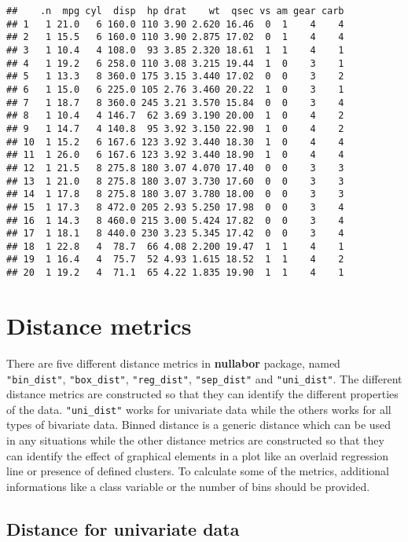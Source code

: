 \begin{verbatim}
##    .n  mpg cyl  disp  hp drat    wt  qsec vs am gear carb
## 1   1 21.0   6 160.0 110 3.90 2.620 16.46  0  1    4    4
## 2   1 15.5   6 160.0 110 3.90 2.875 17.02  0  1    4    4
## 3   1 10.4   4 108.0  93 3.85 2.320 18.61  1  1    4    1
## 4   1 19.2   6 258.0 110 3.08 3.215 19.44  1  0    3    1
## 5   1 13.3   8 360.0 175 3.15 3.440 17.02  0  0    3    2
## 6   1 15.0   6 225.0 105 2.76 3.460 20.22  1  0    3    1
## 7   1 18.7   8 360.0 245 3.21 3.570 15.84  0  0    3    4
## 8   1 10.4   4 146.7  62 3.69 3.190 20.00  1  0    4    2
## 9   1 14.7   4 140.8  95 3.92 3.150 22.90  1  0    4    2
## 10  1 15.2   6 167.6 123 3.92 3.440 18.30  1  0    4    4
## 11  1 26.0   6 167.6 123 3.92 3.440 18.90  1  0    4    4
## 12  1 21.5   8 275.8 180 3.07 4.070 17.40  0  0    3    3
## 13  1 21.0   8 275.8 180 3.07 3.730 17.60  0  0    3    3
## 14  1 17.8   8 275.8 180 3.07 3.780 18.00  0  0    3    3
## 15  1 17.3   8 472.0 205 2.93 5.250 17.98  0  0    3    4
## 16  1 14.3   8 460.0 215 3.00 5.424 17.82  0  0    3    4
## 17  1 18.1   8 440.0 230 3.23 5.345 17.42  0  0    3    4
## 18  1 22.8   4  78.7  66 4.08 2.200 19.47  1  1    4    1
## 19  1 16.4   4  75.7  52 4.93 1.615 18.52  1  1    4    2
## 20  1 19.2   4  71.1  65 4.22 1.835 19.90  1  1    4    1
\end{verbatim}

\section{Distance metrics}\label{distance-metrics}

There are five different distance metrics in \textbf{nullabor} package,
named \texttt{"bin\_dist"}, \texttt{"box\_dist"}, \texttt{"reg\_dist"},
\texttt{"sep\_dist"} and \texttt{"uni\_dist"}. The different distance
metrics are constructed so that they can identify the different
properties of the data. \texttt{"uni\_dist"} works for univariate data
while the others works for all types of bivariate data. Binned distance
is a generic distance which can be used in any situations while the
other distance metrics are constructed so that they can identify the
effect of graphical elements in a plot like an overlaid regression line
or presence of defined clusters. To calculate some of the metrics,
additional informations like a class variable or the number of bins
should be provided.

\subsection{Distance for univariate
data}\label{distance-for-univariate-data}

